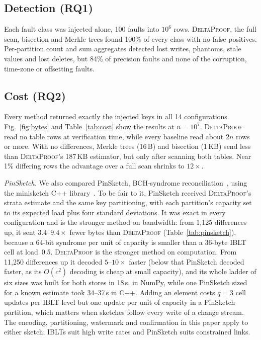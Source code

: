 \documentclass[conference]{IEEEtran}
\newcommand{\sys}{\textsc{DeltaProof}}
\begin{document}
\subsection{Detection (RQ1)}
Each fault class was injected alone, 100 faults into $10^6$ rows. \sys{}, the full scan, bisection and Merkle trees found 100\% of every class with no false positives. Per-partition count and sum aggregates detected lost writes, phantoms, stale values and lost deletes, but 84\% of precision faults and none of the corruption, time-zone or offsetting faults.

\subsection{Cost (RQ2)}
Every method returned exactly the injected keys in all 14 configurations. Fig.~\ref{fig:bytes} and Table~\ref{tab:cost} show the results at $n=10^7$. \sys{} read no table rows at verification time, while every baseline read about $2n$ rows or more. With no differences, Merkle trees (16\,B) and bisection (1\,KB) send less than \sys{}'s 187\,KB estimator, but only after scanning both tables. Near 1\% differing rows the advantage over a full scan shrinks to $12\times$.

\emph{PinSketch.} We also compared PinSketch, BCH-syndrome reconciliation~\cite{minsky2003,dodis2008}, using the minisketch C++ library~\cite{minisketch}. To be fair to it, PinSketch received \sys{}'s strata estimate and the same key partitioning, with each partition's capacity set to its expected load plus four standard deviations. It was exact in every configuration and is the stronger method on bandwidth: from 1{,}125 differences up, it sent $3.4$--$9.4\times$ fewer bytes than \sys{} (Table~\ref{tab:pinsketch}), because a 64-bit syndrome per unit of capacity is smaller than a 36-byte IBLT cell at load~0.5. \sys{} is the stronger method on computation. From 11{,}250 differences up it decoded $5$--$10\times$ faster (below that PinSketch decoded faster, as its $O(c^2)$ decoding is cheap at small capacity), and its whole ladder of six sizes was built for both stores in 18\,s, in NumPy, while one PinSketch sized for a known estimate took 34--37\,s in C++. Adding an element costs $q=3$ cell updates per IBLT level but one update per unit of capacity in a PinSketch partition, which matters when sketches follow every write of a change stream. The encoding, partitioning, watermark and confirmation in this paper apply to either sketch; IBLTs suit high write rates and PinSketch suits constrained links.
\end{document}
